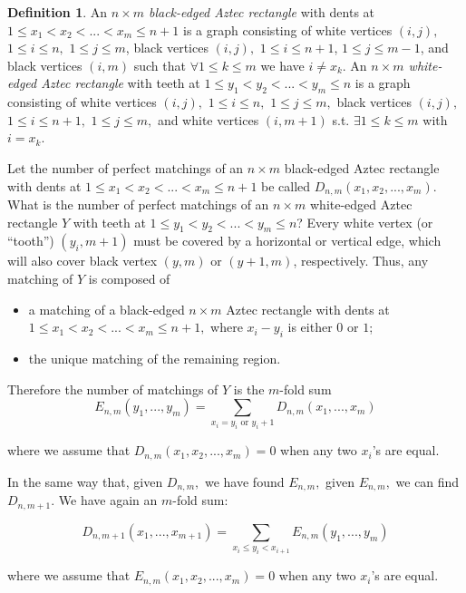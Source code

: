 \documentclass[10pt,reqno]{amsart}
\theoremstyle{plain}
\theoremstyle{definition}
\newtheorem{Def}{Definition}
\theoremstyle{remark}
\begin{document}
\begin{Def} An {\em $n\times m$ black-edged Aztec rectangle} with dents at 
$1\leq x_1<x_2<...<x_m\leq n+1$ is a graph consisting of white vertices 
$(i,j),$ $1\leq i\leq n,$ $1\leq j\leq m$, 
black vertices $(i,j),$ $1\leq i\leq n+1$, $1\leq j\leq m-1$, 
and black vertices $(i,m)$ such that $\forall 1\leq k\leq m$ we have 
$i\ne x_k$.
      An {\em $n\times m$ white-edged Aztec rectangle} with teeth at
$1\leq y_1<y_2<...<y_m\leq n$ is a graph consisting of white vertices $(i,j),$
$1\leq i\leq n,$ $1\leq j\leq m,$ black vertices $(i,j),$ 
$1\leq i\leq n+1,$ $1\leq j\leq m,$ and
white vertices $(i,m+1)$ s.t. $\exists 1\leq k\leq m$ with $i=x_k$.
\end{Def}

Let the number of perfect matchings of an $n\times m$ black-edged 
Aztec rectangle with dents
at $1\leq x_1<x_2<...<x_m\leq n+1$ be called 
$D_{n,m}(x_1,x_2,...,x_m).$
What is the number of perfect matchings of an $n\times m$ white-edged Aztec 
rectangle $Y$ with teeth
at $1\leq y_1<y_2<...<y_m\leq n$? Every white vertex (or ``tooth'') 
$(y_i,m+1)$ must
be covered by a horizontal or vertical edge, which will also cover
black vertex $(y,m)$ or $(y+1,m)$, respectively. Thus, any matching of $Y$ is 
composed of 
\begin{itemize}
\item a matching of a black-edged $n\times m$ 
Aztec rectangle with dents at
$1\leq x_1<x_2<...<x_m\leq n+1,$ where 
$x_i-y_i$ is either $0$ or $1$;
\item the unique matching of the remaining region.
\end{itemize}
 Therefore the number of matchings of $Y$ is the $m$-fold sum
\begin{equation}
E_{n,m}(y_1,...,y_m)=\sum_{x_i=y_i \text{ or } y_i+1} D_{n,m}(x_1,...,x_m)
\label{eq:2} \end{equation}

where we assume that $D_{n,m}(x_1,x_2,...,x_m)=0$ when any two $x_i$'s are 
equal. 

In the same way that, given $D_{n,m},$ we have found $E_{n,m},$ given
$E_{n,m},$ we can find $D_{n,m+1}$. We have again an $m$-fold sum:

\begin{equation}
D_{n,m+1}(x_1,...,x_{m+1})=\sum_{x_i\leq y_i<x_{i+1}} E_{n,m}(y_1,...,y_m)
\label{eq:3}
\end{equation}

where we assume that $E_{n,m}(x_1,x_2,...,x_m)=0$ when any two $x_i$'s are 
equal. 
\end{document}
